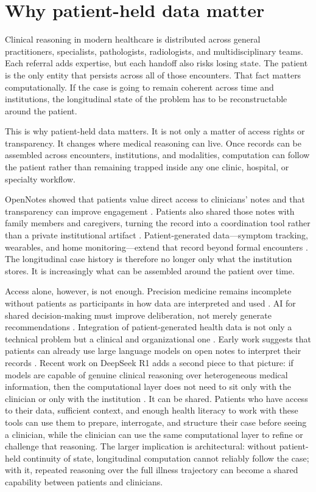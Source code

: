 \documentclass[11pt]{article}
\begin{document}
\section{Why patient-held data matter}
Clinical reasoning in modern healthcare is distributed across general practitioners, specialists, pathologists, radiologists, and multidisciplinary teams. Each referral adds expertise, but each handoff also risks losing state. The patient is the only entity that persists across all of those encounters. That fact matters computationally. If the case is going to remain coherent across time and institutions, the longitudinal state of the problem has to be reconstructable around the patient.

This is why patient-held data matters. It is not only a matter of access rights or transparency. It changes where medical reasoning can live. Once records can be assembled across encounters, institutions, and modalities, computation can follow the patient rather than remaining trapped inside any one clinic, hospital, or specialty workflow.

OpenNotes showed that patients value direct access to clinicians' notes and that transparency can improve engagement \citep{delbanco2010}. Patients also shared those notes with family members and caregivers, turning the record into a coordination tool rather than a private institutional artifact \citep{jackson2014}. Patient-generated data---symptom tracking, wearables, and home monitoring---extend that record beyond formal encounters \citep{park2018}. The longitudinal case history is therefore no longer only what the institution stores. It is increasingly what can be assembled around the patient over time.

Access alone, however, is not enough. Precision medicine remains incomplete without patients as participants in how data are interpreted and used \citep{tuttle2021}. AI for shared decision-making must improve deliberation, not merely generate recommendations \citep{hassan2024}. Integration of patient-generated health data is not only a technical problem but a clinical and organizational one \citep{jim2020}. Early work suggests that patients can already use large language models on open notes to interpret their records \citep{salmi2025}. Recent work on DeepSeek R1 adds a second piece to that picture: if models are capable of genuine clinical reasoning over heterogeneous medical information, then the computational layer does not need to sit only with the clinician or only with the institution \citep{moell2025reasoning}. It can be shared. Patients who have access to their data, sufficient context, and enough health literacy to work with these tools can use them to prepare, interrogate, and structure their case before seeing a clinician, while the clinician can use the same computational layer to refine or challenge that reasoning. The larger implication is architectural: without patient-held continuity of state, longitudinal computation cannot reliably follow the case; with it, repeated reasoning over the full illness trajectory can become a shared capability between patients and clinicians.
\end{document}
